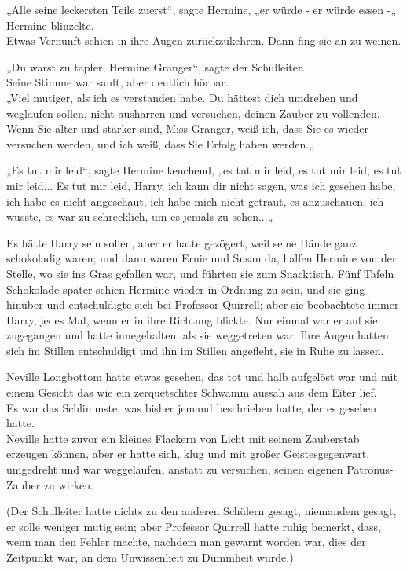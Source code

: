 {„Alle seine leckersten Teile zuerst“, sagte Hermine, „er würde - er würde essen -„\\ Hermine blinzelte.\\ Etwas Vernunft schien in ihre Augen zurückzukehren. Dann fing sie an zu weinen.

„Du warst zu tapfer, Hermine Granger“, sagte der Schulleiter.\\ Seine Stimme war sanft, aber deutlich hörbar.\\ „Viel mutiger, als ich es verstanden habe. Du hättest dich umdrehen und weglaufen sollen, nicht ausharren und versuchen, deinen Zauber zu vollenden. Wenn Sie älter und stärker sind, Miss Granger, weiß ich, dass Sie es wieder versuchen werden, und ich weiß, dass Sie Erfolg haben werden.„

„Es tut mir leid“, sagte Hermine keuchend, „es tut mir leid, es tut mir leid, es tut mir leid... Es tut mir leid, Harry, ich kann dir nicht sagen, was ich gesehen habe, ich habe es nicht angeschaut, ich habe mich nicht getraut, es anzuschauen, ich wusste, es war zu schrecklich, um es jemals zu sehen...„

Es hätte Harry sein sollen, aber er hatte gezögert, weil seine Hände ganz schokoladig waren; und dann waren Ernie und Susan da, halfen Hermine von der Stelle, wo sie ins Gras gefallen war, und führten sie zum Snacktisch. Fünf Tafeln Schokolade später schien Hermine wieder in Ordnung zu sein, und sie ging hinüber und entschuldigte sich bei Professor Quirrell; aber sie beobachtete immer Harry, jedes Mal, wenn er in ihre Richtung blickte. Nur einmal war er auf sie zugegangen und hatte innegehalten, als sie weggetreten war. Ihre Augen hatten sich im Stillen entschuldigt und ihn im Stillen angefleht, sie in Ruhe zu lassen.

Neville Longbottom hatte etwas gesehen, das tot und halb aufgelöst war und mit einem Gesicht das wie ein zerquetschter Schwamm aussah aus dem Eiter lief.\\ Es war das Schlimmste, was bisher jemand beschrieben hatte, der es gesehen hatte.\\ Neville hatte zuvor ein kleines Flackern von Licht mit seinem Zauberstab erzeugen können, aber er hatte sich, klug und mit großer Geistesgegenwart, umgedreht und war weggelaufen, anstatt zu versuchen, seinen eigenen Patronus-Zauber zu wirken.

(Der Schulleiter hatte nichts zu den anderen Schülern gesagt, niemandem gesagt, er solle weniger mutig sein; aber Professor Quirrell hatte ruhig bemerkt, dass, wenn man den Fehler machte, nachdem man gewarnt worden war, dies der Zeitpunkt war, an dem Unwissenheit zu Dummheit wurde.)

}
